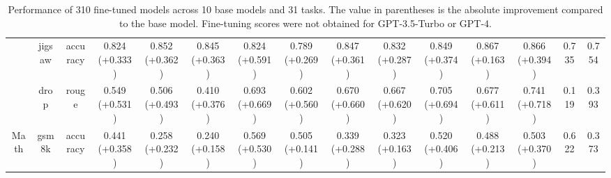 \begin{landscape}
\begin{table}[ht]
{\begin{tabular}{ccccccccccccccc}
                                   & jigsaw                         & accuracy                         & 0.824 (+0.333)     & 0.852 (+0.362)    & 0.845 (+0.363)             & 0.824 (+0.591)    & 0.789 (+0.269)             & 0.847 (+0.361)      & 0.832 (+0.287)           & 0.849 (+0.374)      & 0.867 (+0.163)               & 0.866 (+0.394)          & 0.735                  & 0.754          \\
                                   & drop                           & rouge                            & 0.549 (+0.531)     & 0.506 (+0.493)    & 0.410 (+0.376)             & 0.693 (+0.669)    & 0.602 (+0.560)             & 0.670 (+0.660)      & 0.667 (+0.620)           & 0.705 (+0.694)      & 0.677 (+0.611)               & 0.741 (+0.718)          & 0.119                  & 0.393          \\
\midrule
Math                               & gsm8k                          & accuracy                         & 0.441 (+0.358)     & 0.258 (+0.232)    & 0.240 (+0.158)             & 0.569 (+0.530)    & 0.505 (+0.141)             & 0.339 (+0.288)      & 0.323 (+0.163)           & 0.520 (+0.406)      & 0.488 (+0.213)               & 0.503 (+0.370)          & 0.622                  & 0.373         
\end{tabular}
}

\label{table:finetunedmodelsperformance}
\vspace{10mm}
\caption{Performance of 310 fine-tuned models across 10 base models and 31 tasks. The value in parentheses is the absolute improvement compared to the base model. Fine-tuning scores were not obtained for GPT-3.5-Turbo or GPT-4.}


\end{table}


\begin{table}[ht]

\centering

\scalebox{0.6}{

}
\end{table}
\end{landscape}
